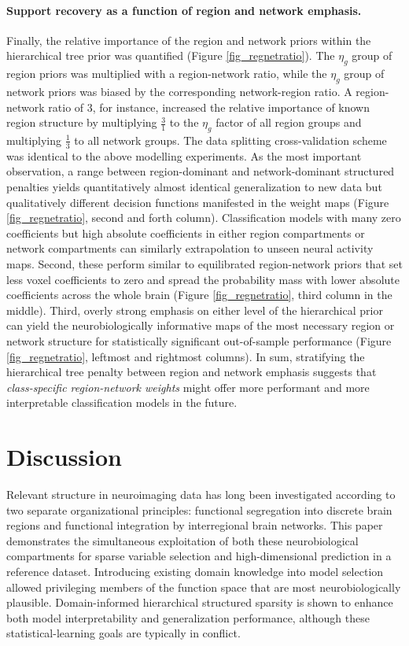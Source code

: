 \documentclass{article} %
\begin{document}
\paragraph{Support recovery as a function of region and network emphasis.}
Finally, the relative importance of the
region and network priors within the hierarchical tree prior
was quantified (Figure \ref{fig_regnetratio}).
The $\eta_g$ group of region priors was multiplied with a
region-network ratio, while the
$\eta_g$ group of network priors was biased by the corresponding
network-region ratio. A region-network ratio of 3, for instance,
increased the relative importance of known region structure
by multiplying $\frac{3}{1}$ to the
$\eta_g$ factor of all region groups
and multiplying
$\frac{1}{3}$ to all network groups.
The data splitting cross-validation scheme was identical to the
above modelling experiments.
%
As the most important observation,
a range between region-dominant and network-dominant structured penalties
yields quantitatively almost identical generalization to new data
but qualitatively different decision functions manifested in the weight maps
(Figure \ref{fig_regnetratio}, second and forth column).
Classification models with many zero coefficients but high absolute
coefficients in either region compartments or network compartments
can similarly extrapolation to unseen neural activity maps.
Second,
these perform similar to equilibrated region-network priors
that set less voxel coefficients to zero and spread the
probability mass with lower absolute coefficients across the whole brain
(Figure \ref{fig_regnetratio}, third column in the middle).
Third,
overly strong emphasis on either level of the hierarchical prior
can yield the neurobiologically informative maps
of the most necessary region or network structure for
statistically significant out-of-sample performance
(Figure \ref{fig_regnetratio}, leftmost and rightmost columns).
%
In sum,
stratifying the hierarchical tree penalty between region and network emphasis
suggests that \textit{class-specific region-network weights}
might offer more performant and more interpretable classification models
in the future.



\section{Discussion}
Relevant structure in neuroimaging data has long been investigated
according to two separate organizational principles:
functional segregation into discrete brain regions
and functional integration by interregional brain networks.
%
This paper demonstrates the simultaneous exploitation of
both these neurobiological compartments
for sparse variable selection and high-dimensional prediction
in a reference dataset.
%
Introducing existing domain knowledge into model selection
allowed privileging members of the function space
that are most neurobiologically plausible.
%
Domain-informed hierarchical structured sparsity is shown to enhance
both model interpretability and generalization performance,
although these statistical-learning goals are typically in conflict.
\end{document}
